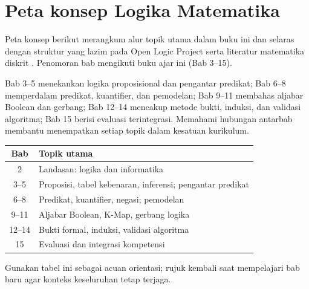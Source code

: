 \section{Peta konsep Logika Matematika}

Peta konsep berikut merangkum alur topik utama dalam buku ini dan selaras dengan struktur yang lazim pada Open Logic Project serta literatur matematika diskrit \cite{openlogic,levin_discrete}. Penomoran bab mengikuti buku ajar ini (Bab 3--15).

Bab 3--5 menekankan logika proposisional dan pengantar predikat; Bab 6--8 memperdalam predikat, kuantifier, dan pemodelan; Bab 9--11 membahas aljabar Boolean dan gerbang; Bab 12--14 mencakup metode bukti, induksi, dan validasi algoritma; Bab 15 berisi evaluasi terintegrasi. Memahami hubungan antarbab membantu menempatkan setiap topik dalam kesatuan kurikulum.

\begin{center}
\begin{tabular}{|c|l|}
\hline
\textbf{Bab} & \textbf{Topik utama} \\
\hline
2 & Landasan: logika dan informatika \\
3--5 & Proposisi, tabel kebenaran, inferensi; pengantar predikat \\
6--8 & Predikat, kuantifier, negasi; pemodelan \\
9--11 & Aljabar Boolean, K-Map, gerbang logika \\
12--14 & Bukti formal, induksi, validasi algoritma \\
15 & Evaluasi dan integrasi kompetensi \\
\hline
\end{tabular}
\end{center}

Gunakan tabel ini sebagai acuan orientasi; rujuk kembali saat mempelajari bab baru agar konteks keseluruhan tetap terjaga.
